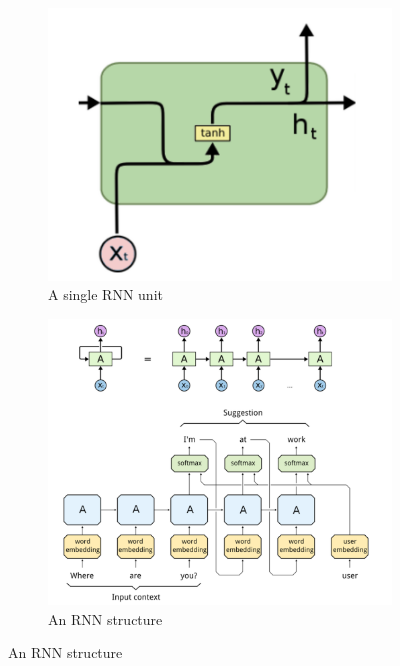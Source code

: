 \begin{figure}[ht]
    \centering
    \begin{subfigure}[b]{0.4\textwidth}
        \includegraphics[width=\linewidth]{img/RNN_unit.png}
        \caption{A single RNN unit}
    \end{subfigure}
    \begin{subfigure}[b]{0.5\textwidth}
        \includegraphics[width=\linewidth]{img/RNN_structure.png}
        \caption{An RNN structure}
    \end{subfigure}
\end{figure}

